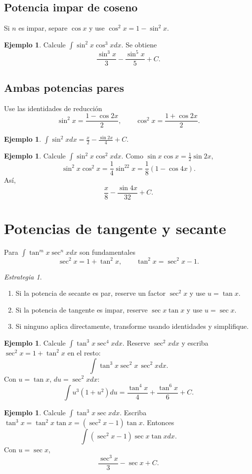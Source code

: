 \documentclass[12pt]{article}
\theoremstyle{definition}\newtheorem{definicion}[teorema]{Definición}\newtheorem{ejemplo}[teorema]{Ejemplo}\newtheorem{ejercicio}[teorema]{Ejercicio}
\theoremstyle{remark}\newtheorem*{observacion}{Observación}\newtheorem*{advertencia}{Advertencia}\newtheorem*{estrategia}{Estrategia}
\begin{document}
\subsection{Potencia impar de coseno}
Si $n$ es impar, separe $\cos x$ y use $\cos^2x=1-\sin^2x$.
\begin{ejemplo}Calcule $\int\sin^2x\cos^3x dx$. Se obtiene\[\boxed{\frac{\sin^3x}{3}-\frac{\sin^5x}{5}+C}.\]\end{ejemplo}
\subsection{Ambas potencias pares}
Use las identidades de reducción
\[\sin^2x=\frac{1-\cos2x}{2},\qquad\cos^2x=\frac{1+\cos2x}{2}.\]
\begin{ejemplo}$\int\sin^2x dx=\boxed{\frac{x}{2}-\frac{\sin2x}{4}+C}$.\end{ejemplo}
\begin{ejemplo}Calcule $\int\sin^2x\cos^2x dx$. Como $\sin x\cos x=\frac12\sin2x$,
\[\sin^2x\cos^2x=\frac14\sin^22x=\frac18(1-\cos4x).\]
Así,
\[\boxed{\frac{x}{8}-\frac{\sin4x}{32}+C}.\]\end{ejemplo}

\section{Potencias de tangente y secante}
Para $\int\tan^m x\sec^n xdx$ son fundamentales
\[\sec^2x=1+\tan^2x,\qquad \tan^2x=\sec^2x-1.\]
\begin{estrategia}
\begin{enumerate}
\item Si la potencia de secante es par, reserve un factor $\sec^2x$ y use $u=\tan x$.
\item Si la potencia de tangente es impar, reserve $\sec x\tan x$ y use $u=\sec x$.
\item Si ninguno aplica directamente, transforme usando identidades y simplifique.
\end{enumerate}
\end{estrategia}
\begin{ejemplo}Calcule $\int\tan^3x\sec^4x dx$. Reserve $\sec^2x dx$ y escriba $\sec^2x=1+\tan^2x$ en el resto:
\[\int\tan^3x\sec^2x\,\sec^2x dx.\]
Con $u=\tan x$, $du=\sec^2x dx$:
\[\int u^3(1+u^2)du=\boxed{\frac{\tan^4x}{4}+\frac{\tan^6x}{6}+C}.\]\end{ejemplo}
\begin{ejemplo}Calcule $\int\tan^3x\sec xdx$. Escriba $\tan^3x=\tan^2x\tan x=(\sec^2x-1)\tan x$. Entonces
\[\int(\sec^2x-1)\sec x\tan xdx.\]
Con $u=\sec x$,
\[\boxed{\frac{\sec^3x}{3}-\sec x+C}.\]\end{ejemplo}
\end{document}
